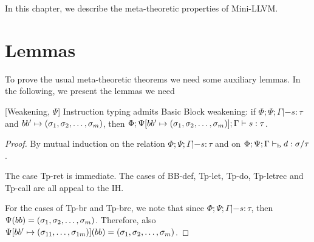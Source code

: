 \documentclass[a4paper, oneside, 10pt, draft]{memoir}
\begin{document}
In this chapter, we describe the meta-theoretic properties of
Mini-LLVM.

\section{Lemmas}

To prove the usual meta-theoretic theorems we need some auxiliary
lemmas. In the following, we present the lemmas we need

\begin{lem}{[Weakening, $\Psi$]}
  \label{lem:weaken-psi}
  Instruction typing admits Basic Block weakening: if $\Phi;\Psi;\Gamma
  |- s : \tau$ and $bb' \mapsto (\sigma_1, \sigma_2, \dotsc, \sigma_m)$, then $\Phi;\Psi[bb' \mapsto
  (\sigma_1, \sigma_2, \dotsc, \sigma_m)];\Gamma |- s : \tau$.
\end{lem}
\begin{proof}
  By mutual induction on the relation $\Phi;\Psi;\Gamma |- s : \tau$
  and on $\Phi;\Psi;\Gamma |-_{\mathrm{b}} d : \sigma / \tau$.

  The case Tp-ret is immediate. The cases of BB-def, Tp-let, Tp-do,
  Tp-letrec and Tp-call are all appeal to the IH.

  For the cases of Tp-br and Tp-brc, we note that since
  $\Phi;\Psi;\Gamma |- s : \tau$, then $\Psi(bb) =
  (\sigma_1, \sigma_2, \dotsc, \sigma_m)$. Therefore, also $\Psi[bb' \mapsto (\sigma_{11}, \dotsc,
  \sigma_{1m})](bb) = (\sigma_1, \sigma_2, \dotsc, \sigma_m)$.
\end{proof}
\end{document}
